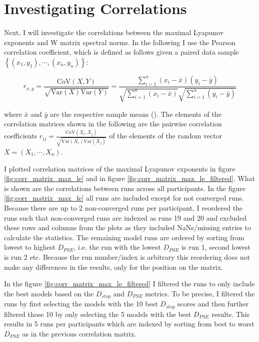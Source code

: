 \FloatBarrier
\section{Investigating Correlations}

Next, I will investigate the correlations between the maximal Lyapunov exponents and W matrix spectral norms. In the following I use the Pearson correlation coefficient, which 
is defined as follows given a paired data sample $\left\{ (x_1, y_1), \cdots, (x_n, y_n) \right\}$:

\begin{equation}
    r_{x, y} = \frac{\text{CoV}(X, Y)}{\sqrt{\text{Var}(X)\text{Var}(Y)}} = \frac{\sum_{i=1}^{n}(x_i - \bar{x})(y_i - \bar{y})}{\sqrt{\sum_{i=1}^{n}(x_i - \bar{x})} \sqrt{\sum_{i=1}^{n}(y_i - \bar{y})}}
    \label{eq:cor_coef_def}
\end{equation}

where $\bar{x}$ and $\bar{y}$ are the respective sample means (\cite{mcdonald2014handbook}). The elements of the correlation matrices shown in the following 
are the pairwise correlation coefficients $r_{ij} = \frac{\text{CoV}(X_i, X_j)}{\sqrt{\text{Var}(X_i)\text{Var}(X_j)}}$ of the elements of the 
random vector $X = \left(X_1, \cdots, X_n\right)$.

I plotted correlation matrices of the maximal Lyapunov exponents in figure \ref{fig:corr_matrix_max_le} and in figure \ref{fig:corr_matrix_max_le_filtered}. What is shown are the 
correlations between runs across all participants. In the figure \ref{fig:corr_matrix_max_le} all runs are included except for not converged runs. Because there are up to 2 non-converged
runs per participant, I reordered the runs such that non-converged runs are indexed as runs 19 and 20 and excluded these rows and columns from the plots as they included NaNs/missing 
entries to calculate the statistics. The remaining model runs are ordered by sorting from lowest to highest $D_{PSE}$,
i.e. the run with the lowest $D_{PSE}$ is run 1, second lowest is run 2 etc. Because the run number/index is arbitrary this reordering 
does not make any differences in the results, only for the position on the matrix.

In the figure \ref{fig:corr_matrix_max_le_filtered} I filtered the runs to only include the best models based on the $D_{stsp}$ and $D_{PSE}$ metrics. To be precise,
I filtered the runs by first selecting the models with the 10 best $D_{stsp}$ scores and then further filtered those 10 by only selecting the 5 models with the best $D_{PSE}$ results.
This results in 5 runs per participants which are indexed by sorting from best to worst $D_{PSE}$ as in the previous correlation matrix.

